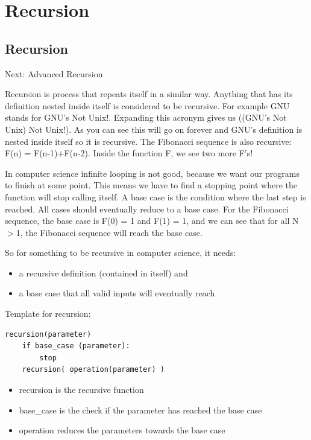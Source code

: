 \documentclass[11pt,oneside]{book}
\begin{document}
    \chapter{ Recursion }
        \section{ Recursion }
        

Next: Advanced Recursion

Recursion is process that repeats itself in a similar way. Anything that has its definition nested inside itself is considered to be recursive. For example GNU stands for GNU's Not Unix!. Expanding this acronym gives us ((GNU's Not Unix) Not Unix!). As you can see this will go on forever and GNU's definition is nested inside itself so it is recursive. The Fibonacci sequence is also recursive: F(n) = F(n-1)+F(n-2). Inside the function F, we see two more F's!

In computer science infinite looping is not good, because we want our programs to finish at some point. This means we have to find a stopping point where the function will stop calling itself. A base case is the condition where the last step is reached. All cases should eventually reduce to a base case. For the Fibonacci sequence, the base case is F(0) = 1 and F(1) = 1, and we can see that for all N$>$1, the Fibonacci sequence will reach the base case.

So for something to be recursive in computer science, it needs:

\begin{itemize}
\item a recursive definition (contained in itself) and 
\item a base case that all valid inputs will eventually reach
\end{itemize}

Template for recursion:

\begin{lstlisting}
recursion(parameter)
    if base_case (parameter):
        stop
    recursion( operation(parameter) )
\end{lstlisting}

\begin{itemize}
\item recursion is the recursive function
\item base\_case is the check if the parameter has reached the base case
\item operation reduces the parameters towards the base case
\end{itemize}
\end{document}
